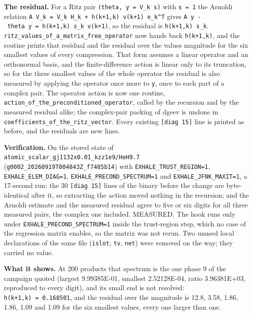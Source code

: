 \documentclass[english,a4paper]{my_memo}
\begin{document}
\textbf{The residual.} For a Ritz pair \texttt{(theta,\ y\ =\ V\_k\ s)} with \texttt{\textbar{}\textbar{}s\textbar{}\textbar{}\ =\ 1} the
Arnoldi relation \texttt{A\ V\_k\ =\ V\_k\ H\_k\ +\ h(k+1,k)\ v(k+1)\ e\_k\^{}T} gives
\texttt{A\ y\ -\ theta\ y\ =\ h(k+1,k)\ s\_k\ v(k+1)}, so the residual is \texttt{\textbar{}h(k+1,k)\textbar{}\ \textbar{}s\_k\textbar{}}.
\texttt{ritz\_values\_of\_a\_matrix\_free\_operator} now hands back \texttt{h(k+1,k)}, and the
routine prints that residual and the residual over the value\textquotesingle s magnitude for
the six smallest values of every compression. That form assumes a linear
operator and an orthonormal basis, and the finite-difference action is linear
only to its truncation, so for the three smallest values of the whole operator
the residual is also measured by applying the operator once more to \texttt{y}, once
to each part of a complex pair. The operator action is now one routine,
\texttt{action\_of\_the\_preconditioned\_operator}, called by the recursion and by the
measured residual alike; the complex-pair packing of dgeev is undone in
\texttt{coefficients\_of\_the\_ritz\_vector}. Every existing \texttt{{[}diag\ 15{]}} line is printed
as before, and the residuals are new lines.

\textbf{Verification.} On the stored state of
\texttt{atomic\_scalar\_gj1132x0.01\_kzz1e9/HeH9.7}
(\texttt{g0002\_20260919T004843Z\_f7485b14}) with \texttt{EXHALE\_TRUST\_REGION=1},
\texttt{EXHALE\_ELEM\_DIAG=1}, \texttt{EXHALE\_PRECOND\_SPECTRUM=1} and \texttt{EXHALE\_JFNK\_MAXIT=1}, a
17-second run: the 30 \texttt{{[}diag\ 15{]}} lines of the binary before the change are
byte-identical after it, so extracting the action moved nothing in the
recursion; and the Arnoldi estimate and the measured residual agree to five or
six digits for all three measured pairs, the complex one included. MEASURED.
The hook runs only under \texttt{EXHALE\_PRECOND\_SPECTRUM=1} inside the trust-region
step, which no case of the regression matrix enables, so the matrix was not
rerun. Two unused local declarations of the same file (\texttt{islot}; \texttt{tv}, \texttt{net})
were removed on the way; they carried no value.

\textbf{What it shows.} At 200 products that spectrum is the one phase 9 of the
campaign quoted (largest 9.99385E-01, smallest 2.52128E-04, ratio 3.96381E+03,
reproduced to every digit), and its small end is not resolved:
\texttt{h(k+1,k)\ =\ 0.168501}, and the residual over the magnitude is 12.8, 3.58, 1.86,
1.86, 1.09 and 1.09 for the six smallest values, every one larger than one.
\end{document}
